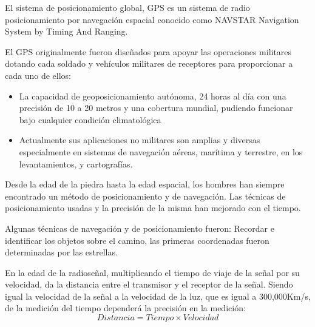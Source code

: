 El sistema de posicionamiento global, GPS es un sistema de radio posicionamiento por navegación espacial conocido como NAVSTAR Navigation System by Timing And Ranging.

El GPS originalmente fueron diseñados para apoyar las operaciones militares dotando cada soldado y vehículos militares de receptores para proporcionar a cada uno de ellos:
\begin{itemize}
    \item La capacidad de geoposicionamiento autónoma, 24 horas al día con una precisión de 10 a 20 metros y una cobertura mundial, pudiendo funcionar bajo cualquier condición climatológica
    \item Actualmente sus aplicaciones no militares son amplias y diversas especialmente en sistemas de navegación aéreas, marítima y terrestre, en los levantamientos, y cartografías.
\end{itemize}
Desde la edad de la piedra hasta la edad espacial, los hombres han siempre encontrado un método de posicionamiento y de navegación. Las técnicas de posicionamiento usadas y la precisión de la misma han mejorado con el tiempo.

Algunas técnicas de navegación y de posicionamiento fueron: 
Recordar e identificar los objetos sobre el camino, las primeras coordenadas fueron determinadas por las estrellas.

En la edad de la radioseñal, multiplicando el tiempo de viaje de la señal por su velocidad, da la distancia entre el transmisor y el receptor de la señal. Siendo igual la velocidad de la señal a la velocidad de la luz, que es igual a 300,000Km/s, de la medición del tiempo dependerá la precisión en la medición:
\begin{equation}
    Distancia = Tiempo\times Velocidad
\end{equation}













